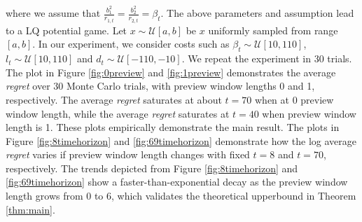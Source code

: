 \documentclass[letterpaper, 10 pt, conference]{ieeeconf}  %
\begin{document}
where we assume that $\frac{b_{1}^{2}}{r_{1,t}}=\frac{b_{2}^{2}}{r_{2,t}} = \beta_{t}$. The above parameters and assumption lead to a LQ potential game. Let $x \sim \mathcal{U}[a,b]$ be $x$ uniformly sampled from range $[a,b]$. In our experiment, we consider costs such as $\beta_{t} \sim \mathcal{U}[10,110]$, $l_{t} \sim \mathcal{U}[10,110]$ and $d_{t}\sim \mathcal{U}[-110,-10]$. We repeat the experiment in 30 trials. The plot in Figure \ref{fig:0preview} and \ref{fig:1preview} demonstrates the average \emph{regret} over 30 Monte Carlo trials, with preview window lengths 0 and 1, respectively. The average \emph{regret} saturates at about $t=70$ when at 0 preview window length, while the average \emph{regret} saturates at $t = 40$ when preview window length is 1. These plots empirically demonstrate the main result. The plots in Figure \ref{fig:8timehorizon} and \ref{fig:69timehorizon} demonstrate how the log average \emph{regret} varies if preview window length changes with fixed $t=8$ and $t=70$, respectively. The trends depicted from Figure \ref{fig:8timehorizon} and \ref{fig:69timehorizon} show a faster-than-exponential decay as the preview window length grows from 0 to 6, which validates the theoretical upperbound in Theorem \ref{thm:main}.
\end{document}
